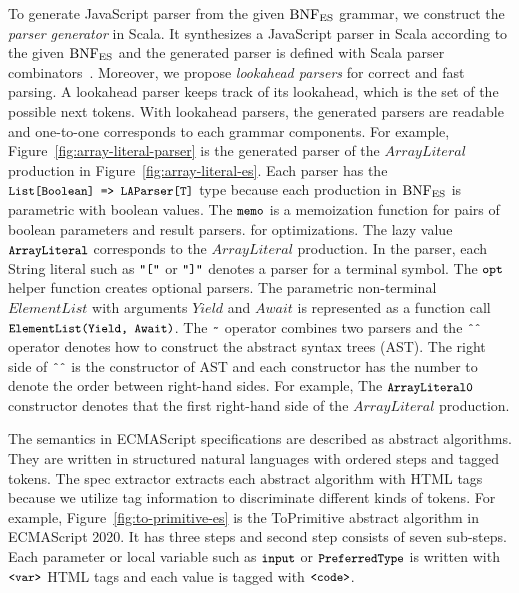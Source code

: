 To generate JavaScript parser from the given \( \text{BNF}_{\text{ES}} \) grammar,
we construct the \textit{parser generator} in Scala.
It synthesizes a JavaScript parser in Scala according to the given \( \text{BNF}_{\text{ES}} \)
and the generated parser is defined with Scala parser combinators~\cite{scala-parser-combinators}.
Moreover, we propose \textit{lookahead parsers} for correct and fast parsing.
A lookahead parser keeps track of its lookahead, which is the set of
the possible next tokens. With lookahead parsers, the generated parsers are
readable and one-to-one corresponds to each grammar components.
For example, Figure~\ref{fig:array-literal-parser} is the generated parser of
the \( ArrayLiteral \) production in Figure~\ref{fig:array-literal-es}.
Each parser has the \( \texttt{\small List[Boolean] => LAParser[T]} \) type because
each production in \( \text{BNF}_{\text{ES}} \) is parametric with boolean values.
The \( \texttt{\small memo} \) is a memoization function for pairs of boolean parameters and result parsers.
for optimizations. The lazy value \( \texttt{\small ArrayLiteral} \) corresponds to the \( ArrayLiteral \)
production. In the parser, each String literal such as \( \texttt{\small"["} \) or \( \texttt{\small"]"} \)
denotes a parser for a terminal symbol. The \( \texttt{\small opt} \) helper function creates
optional parsers. The parametric non-terminal \( ElementList \) with arguments \( Yield \)
and \( Await \) is represented as a function call \( \texttt{\small ElementList(Yield, Await)} \).
The \( \texttt{\small\textasciitilde} \) operator combines two parsers
and the \( \texttt{\small\^{}\^{}} \) operator denotes how to construct the abstract syntax trees (AST).
The right side of \( \texttt{\small\^{}\^{}} \) is the constructor of AST and each constructor
has the number to denote the order between right-hand sides. For example,
The \( \texttt{\small ArrayLiteral0} \) constructor denotes that the first right-hand side of
the \( ArrayLiteral \) production.

The semantics in ECMAScript specifications are described as
abstract algorithms. They are written in structured natural languages
with ordered steps and tagged tokens. The spec extractor extracts each abstract algorithm
with HTML tags because we utilize tag information to discriminate different kinds of tokens.
For example, Figure~\ref{fig:to-primitive-es} is the ToPrimitive
abstract algorithm in ECMAScript 2020. It has three steps and
second step consists of seven sub-steps. Each parameter or local variable such as
\( \texttt{\small input} \) or \( \texttt{\small PreferredType} \) is written with \( \texttt{\small<var>} \) HTML tags
and each value is tagged with \( \texttt{\small<code>} \).

